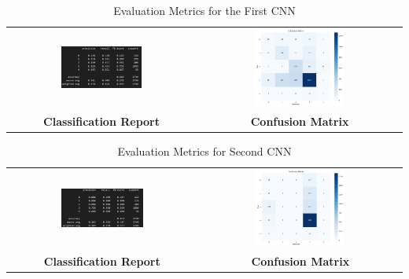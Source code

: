 \documentclass{article}
\begin{document}
\begin{table}[h!]
    \centering
    \begin{tabular}{cc}
        \includegraphics[width=0.45\textwidth]{DeepCNN.png} &
        \includegraphics[width=0.45\textwidth]{deep_cnn_cf.png} \\
        \multicolumn{1}{c}{\textbf{Classification Report}} &
        \multicolumn{1}{c}{\textbf{Confusion Matrix}} \\
    \end{tabular}
    \caption{Evaluation Metrics for the First CNN}
    \label{tab:deep_cnn_metrics}
\end{table}
\vspace{1cm}
\begin{table}[h!]
    \centering
    \begin{tabular}{cc}
        \includegraphics[width=0.45\textwidth]{ImprovedCNN.png} &
        \includegraphics[width=0.45\textwidth]{improved_cnn_cf.png} \\
        \multicolumn{1}{c}{\textbf{Classification Report}} &
        \multicolumn{1}{c}{\textbf{Confusion Matrix}} \\
    \end{tabular}
    \caption{Evaluation Metrics for Second CNN}
    \label{tab:improved_cnn_metrics}
\end{table}
\end{document}
